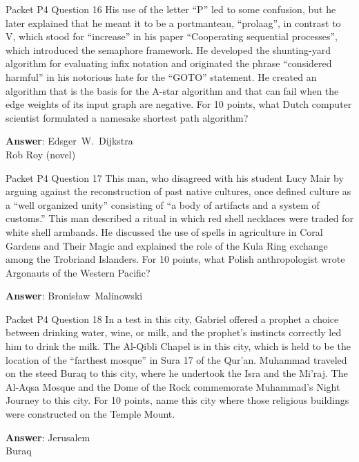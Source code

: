 \begin{frame}{Packet P4 Question 16}
His use of the letter ``P'' led to some confusion, but he later explained that he meant it to be a portmanteau, ``prolaag'', in   contrast to V, which stood for ``increase'' in his paper ``Cooperating sequential processes'', which introduced the semaphore framework.  He developed the shunting-yard algorithm for   evaluating infix notation and originated   the phrase “considered harmful” in his notorious hate for the “GOTO” statement.   He created an algorithm that is the basis for the A-star algorithm   and that can fail when the edge weights of its input graph are negative. For 10 points, what Dutch computer scientist formulated a namesake shortest path algorithm?

\textbf{Answer}: Edsger\ W.\ Dijkstra\\
 Rob Roy (novel)
\end{frame}

\begin{frame}{Packet P4 Question 17}
This man, who disagreed with his student Lucy Mair by arguing against the reconstruction of past native cultures, once defined culture as a “well organized unity” consisting of “a body of artifacts and a system of customs.” This man described a ritual in which red shell necklaces were   traded for white shell armbands. He   discussed the use of spells in agriculture in Coral Gardens     and Their Magic and explained the role of the Kula Ring exchange among the Trobriand Islanders. For 10 points, what Polish anthropologist wrote Argonauts of the Western Pacific?

\textbf{Answer}: Bronisław\ Malinowski\\
\end{frame}

\begin{frame}{Packet P4 Question 18}
In a test in this city, Gabriel offered a prophet a choice between drinking water, wine, or milk, and the prophet’s instincts correctly led him to drink the milk. The Al-Qibli Chapel is in this city, which is held to be the location of the “farthest mosque” in Sura 17 of the Qur’an. Muhammad traveled   on the steed Buraq to this city, where he undertook the Isra and the Mi'raj. The Al-Aqsa Mosque and   the Dome of the Rock   commemorate Muhammad’s   Night Journey to this city. For 10 points, name this city where those religious   buildings were constructed on the Temple Mount.

\textbf{Answer}: Jerusalem\\
 Buraq
\end{frame}

